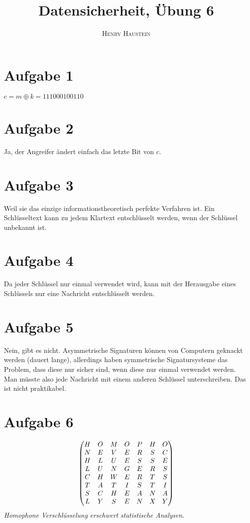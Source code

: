 \documentclass{article}
\title{\textbf{Datensicherheit, Übung 6}}
\author{\textsc{Henry Haustein}}
\date{}
\begin{document}
	\maketitle
	
	\section*{Aufgabe 1}
	$c = m \oplus k = 111000100110$

	\section*{Aufgabe 2}
	Ja, der Angreifer ändert einfach das letzte Bit von $c$.
	
	\section*{Aufgabe 3}
	Weil sie das einzige informationstheoretisch perfekte Verfahren ist. Ein Schlüsseltext kann zu jedem Klartext entschlüsselt werden, wenn der Schlüssel unbekannt ist.
	
	\section*{Aufgabe 4}
	Da jeder Schlüssel nur einmal verwendet wird, kann mit der Herausgabe eines Schlüssels nur eine Nachricht entschlüsselt werden.
	
	\section*{Aufgabe 5}
	Nein, gibt es nicht. Asymmetrische Signaturen können von Computern geknackt werden (dauert lange), allerdings haben symmetrische Signatursysteme das Problem, dass diese nur sicher sind, wenn diese nur einmal verwendet werden. Man müsste also jede Nachricht mit einem anderen Schlüssel unterschreiben. Das ist nicht praktikabel.
	
	\section*{Aufgabe 6}
	\begin{align}
		\begin{pmatrix}
			H & O & M & O & P & H & O \\
			N & E & V & E & R & S & C \\
			H & L & U & E & S & S & E \\
			L & U & N & G & E & R & S \\
			C & H & W & E & R & T & S \\
			T & A & T & I & S & T & I \\
			S & C & H & E & A & N & A \\
			L & Y & S & E & N & X & Y
		\end{pmatrix} \notag
	\end{align}
	\textit{Homophone Verschlüsselung erschwert statistische Analysen}.
	
\end{document}
